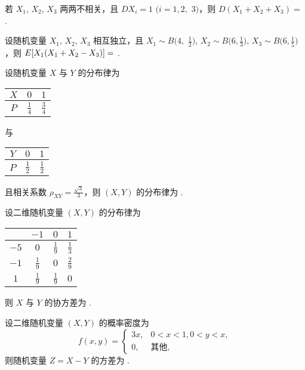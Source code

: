 	\begin{titwo}
		若 $X_{1}$, $X_{2}$, $X_{3}$ 两两不相关，且 $DX_{i} = 1$ $(i = 1,2,$ $3)$，则 $D(X_{1} + X_{2} + X_{3}) = $ \htwo.
	\end{titwo}

	\begin{titwo}
		设随机变量 $X_{1}$, $X_{2}$, $X_{3}$ 相互独立，且 $X_{1} \sim B \bigl( 4,$ $\frac{1}{2} \bigr)$, $X_{2} \sim B \bigl( 6,\frac{1}{3} \bigr)$, $X_{3} \sim B\bigl( 6,\frac{1}{5} \bigr)$，则 $E[ X_{1} \* (X_{1} + X_{2} - X_{3}) ] = $ \htwo.
	\end{titwo}

	\begin{titwo}
		设随机变量 $X$ 与 $Y$ 的分布律为 \begin{tabular}{c|cc}
			\hline
			$X$ & $0$ & $1$ \\
			\hline
			$P$ & $\frac{1}{4}$ & $\frac{3}{4}$ \\
			\hline
		\end{tabular} 与 \begin{tabular}{c|cc}
			\hline
			$Y$ & $0$ & $1$ \\
			\hline
			$P$ & $\frac{1}{2}$ & $\frac{1}{2}$ \\
			\hline
		\end{tabular} 且相关系数 $\rho_{XY} = \frac{\sqrt{3}}{3}$，则 $(X,Y)$ 的分布律为 \htwo.
	\end{titwo}

	\begin{titwo}
		设二维随机变量 $(X,Y)$ 的分布律为
		\begin{center}
			\begin{tabular}{c|ccc}
				\hline
				\diagbox{$X$}{$Y$} & $-1$ & $0$ & $1$ \\
				\hline
				$-5$ & $0$ & $\frac{1}{9}$ & $\frac{1}{3}$ \\
				$-1$ & $\frac{1}{9}$ & $0$ & $\frac{2}{9}$ \\
				$1$ & $\frac{1}{9}$ & $\frac{1}{9}$ & $0$ \\
				\hline
			\end{tabular}
		\end{center}
		则 $X$ 与 $Y$ 的协方差为 \htwo.
	\end{titwo}

	\begin{titwo}
		设二维随机变量 $(X,Y)$ 的概率密度为
		\[
			f(x,y) = \begin{cases}
				3x, & 0 < x < 1,0 < y < x, \\
				0, & \text{其他},
			\end{cases}
		\]
		则随机变量 $Z = X - Y$ 的方差为 \htwo.
	\end{titwo}

